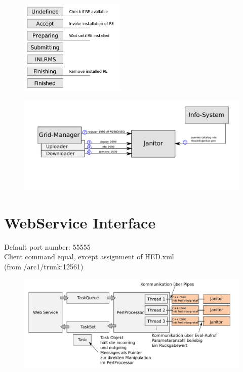 \begin{figure}[!h]
  \begin{center}
    \includegraphics[width=5cm]{images/arex-stages.pdf}
    \mycaption{}{}
    \label{fig:RE_states}
  \end{center}
\end{figure}

\begin{figure}[!h]
  \begin{center}
    \includegraphics[width=12cm]{images/janitor_integration_2nd_edition.pdf}
    \mycaption{}{}
    \label{fig:RE_states}
  \end{center}
\end{figure}

\section{WebService Interface}

Default port number: 55555\\
Client command equal, except assignment of HED.xml\\
 (from /arc1/trunk:12561)

\begin{figure}[!h]
  \begin{center}
    \includegraphics[width=12cm]{images/WS_structure.pdf}
    \label{fig:RE_states}
  \end{center}
\end{figure}

